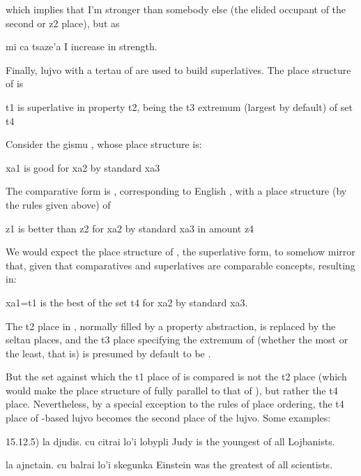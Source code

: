 {\noindent}which implies that I'm stronger than somebody else (the elided
    occupant of the second or z2 place), but as
\begin{example}
mi ca tsaze'a\n
I increase in strength.
\end{example}

Finally, lujvo with a tertau of  are used to build
    superlatives. The place structure of  is
\begin{example}
t1 is superlative in property t2, being\n
\T	the t3 extremum (largest by default) of set t4
\end{example}

Consider the gismu , whose place structure is:
\begin{example}
xa1 is good for xa2 by standard xa3
\end{example}

The comparative form is , corresponding to English
    , with a place structure (by the rules given above)
    of
\begin{example}
z1 is better than z2 for xa2 by standard xa3\n
\T	in amount z4
\end{example}

We would expect the place structure of , the
    superlative form, to somehow mirror that, given that
    comparatives and superlatives are comparable concepts,
    resulting in:
\begin{example}
xa1=t1 is the best of the set t4 for xa2\n
\T	by standard xa3.
\end{example}

The t2 place in , normally filled by a property
    abstraction, is replaced by the seltau places, and the t3 place
    specifying the extremum of  (whether the most or the
    least, that is) is presumed by default to be .

But the set against which the t1 place of  is
    compared is not the t2 place (which would make the place
    structure of  fully parallel to that of ),
    but rather the t4 place. Nevertheless, by a special exception
    to the rules of place ordering, the t4 place of -based
    lujvo becomes the second place of the lujvo. Some examples:

\label{html:e15d12.5}
15.12.5)  la djudis. cu citrai lo'i lobypli
    Judy is the youngest of all Lojbanists.
\begin{example}
la ajnctain. cu balrai lo'i skegunka\n
Einstein was the greatest of all scientists.
\end{example}



